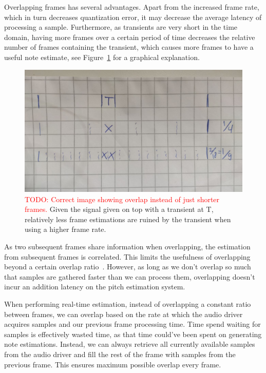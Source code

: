 \documentclass[a4paper,10pt,twocolumn]{article}
\begin{document}
Overlapping frames has several advantages. Apart from the increased frame rate, which in turn decreases quantization error, it may decrease the average latency of processing a sample. Furthermore, as transients are very short in the time domain, having more frames over a certain period of time decreases the relative number of frames containing the transient, which causes more frames to have a useful note estimate, see Figure~\ref{fig:overlap_transient} for a graphical explanation.
\begin{figure}[h]
    \centering
    \includegraphics[width=\linewidth]{fig/overlap_transient.jpg}
    \caption{\textcolor{red}{TODO: Correct image showing overlap instead of just shorter frames.} Given the signal given on top with a transient at T, relatively less frame estimations are ruined by the transient when using a higher frame rate.}
    \label{fig:overlap_transient}
\end{figure}

As two subsequent frames share information when overlapping, the estimation from subsequent frames is correlated. This limits the usefulness of overlapping beyond a certain overlap ratio~\cite{overlap}. However, as long as we don't overlap so much that samples are gathered faster than we can process them, overlapping doesn't incur an addition latency on the pitch estimation system.

When performing real-time estimation, instead of overlapping a constant ratio between frames, we can overlap based on the rate at which the audio driver acquires samples and our previous frame processing time. Time spend waiting for samples is effectively wasted time, as that time could've been spent on generating note estimations. Instead, we can always retrieve all currently available samples from the audio driver and fill the rest of the frame with samples from the previous frame. This ensures maximum possible overlap every frame.
\end{document}
